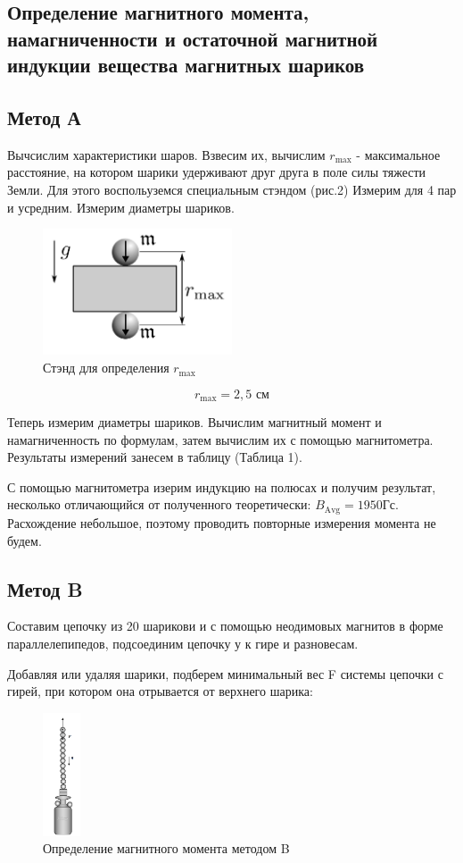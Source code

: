 \documentclass[a4paper, 12pt]{article}
\begin{document}
\subsection{Определение магнитного момента, намагниченности и остаточной магнитной
индукции вещества магнитных шариков}
\subsection{Метод А}
Вычсислим характеристики шаров. Взвесим их,
вычислим $r_\text{max}$ - максимальное расстояние, на котором шарики удерживают друг друга в 
поле силы тяжести Земли.
Для этого воспольуземся специальным стэндом (рис.2)\newline
Измерим для 4 пар и усредним. Измерим диаметры шариков.
\begin{figure}[h]
  \centering    
    \includegraphics[width=0.5\textwidth]{Images/rmax.png}
    \caption{Стэнд для определения $r_\text{max}$}
\end{figure}

\[r_\text{max}=2,5 \text{ см}\]

Теперь измерим диаметры шариков. Вычислим магнитный момент и намагниченность по формулам, 
затем вычислим их с помощью магнитометра. Результаты измерений занесем в таблицу (Таблица 1).


С помощью магнитометра изерим индукцию на полюсах и получим результат, несколько отличающийся
от полученного теоретически: $B_\text{Avg} = 1950\text{Гс}$. Расхождение небольшое, поэтому
проводить повторные измерения момента не будем.

\newpage
\subsection{Метод B}
Составим цепочку из 20 шарикови и с помощью
неодимовых магнитов в форме параллелепипедов, подсоединим цепочку у к гире и разновесам.

 Добавляя или удаляя шарики, подберем минимальный вес
F системы цепочки с гирей, при котором она отрывается от верхнего шарика:
\begin{figure}[h]
  \centering
  \includegraphics[width=0.1\textwidth]{Images/MethB.png}
  \caption{Определение магнитного момента методом B}
\end{figure} 
\end{document}
